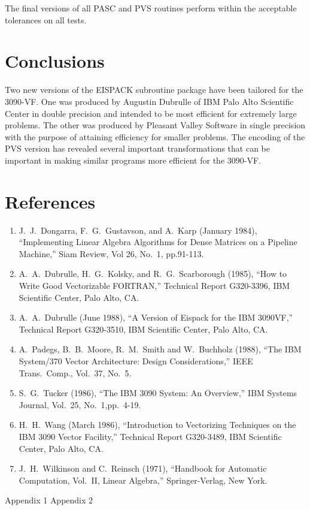 The final versions of all PASC and PVS routines perform 
within the acceptable tolerances on all tests.

\section{Conclusions}
Two new versions of the EISPACK subroutine package have been
tailored for the 3090-VF. One was produced by Augustin Dubrulle
of IBM Palo Alto Scientific Center
in double precision and intended to be most efficient for
extremely large problems. The other was produced by Pleasant
Valley Software in single precision with the purpose of
attaining efficiency for smaller problems. The encoding
of the PVS version has revealed several important transformations
that can be important in making similar programs more
efficient for the 3090-VF.

\newpage
\section{References}

\begin{enumerate}
  \item
    J.~J.~Dongarra, F.~G.~Gustavson, and A.~Karp  (January 1984),
    ``Implementing Linear Algebra Algorithms for Dense Matrices
    on a Pipeline Machine,''
    Siam Review, Vol 26, No.~1, pp.91-113.
  \item
    A.~A.~Dubrulle, H.~G.~Kolsky, and R.~G.~Scarborough (1985),
    ``How to Write Good Vectorizable FORTRAN,'' Technical Report G320-3396,
    IBM Scientific Center, Palo Alto, CA.
  \item
    A.~A.~Dubrulle (June 1988),
    ``A Version of Eispack for the IBM 3090VF,'' Technical Report G320-3510,
    IBM Scientific Center, Palo Alto, CA.
  \item
    A.~Padegs, B.~B.~Moore, R.~M.~Smith and W.~Buchholz (1988),
    ``The IBM System/370 Vector Architecture: Design Considerations,''
    IEEE Trans.\ Comp., Vol.\ 37, No.\ 5.
  \item
    S.~G.~Tucker (1986),
    ``The IBM 3090 System: An Overview,''
    IBM Systems Journal, Vol.\ 25, No.\ 1,pp.\ 4-19.
  \item
    H.~H.~Wang (March 1986),
    ``Introduction to Vectorizing Techniques on the IBM 3090 Vector Facility,''
    Technical Report G320-3489, IBM Scientific Center, Palo Alto, CA.
  \item
    J.~H.~Wilkinson and C.~Reinsch (1971),
    ``Handbook for Automatic Computation, Vol.\ II, Linear Algebra,'' 
    Springer-Verlag, New York.
\end{enumerate}

\newpage
\vfil
\hfil {\Large Appendix 1} \hfil
\vfil
\newpage
\vfil
\hfil {\Large Appendix 2} \hfil
\vfil

